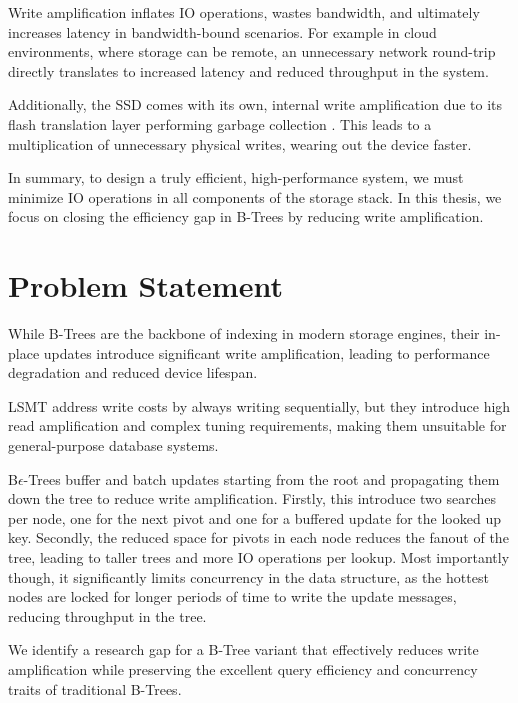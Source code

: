 Write amplification inflates \ac{IO} operations, wastes bandwidth, and ultimately increases latency in bandwidth-bound scenarios.
For example in cloud environments, where storage can be remote, an unnecessary network round-trip directly translates to increased latency and reduced throughput in the system.

Additionally, the \ac{SSD} comes with its own, internal write amplification due to its flash translation layer performing garbage collection \cite{haas2023modern}. 
This leads to a multiplication of unnecessary physical writes, wearing out the device faster.

In summary, to design a truly efficient, high-performance system, we must minimize \ac{IO} operations in all components of the storage stack. 
In this thesis, we focus on closing the efficiency gap in B-Trees by reducing write amplification.

\section{Problem Statement}
While B-Trees are the backbone of indexing in modern storage engines, their in-place updates introduce significant write amplification, leading to performance degradation and reduced device lifespan. 

\ac{LSMT} address write costs by always writing sequentially, but they introduce high read amplification and complex tuning requirements, making them unsuitable for general-purpose database systems.

B$\epsilon$-Trees buffer and batch updates starting from the root and propagating them down the tree to reduce write amplification. 
Firstly, this introduce two searches per node, one for the next pivot and one for a buffered update for the looked up key.
Secondly, the reduced space for pivots in each node reduces the fanout of the tree, leading to taller trees and more \ac{IO} operations per lookup.
Most importantly though, it significantly limits concurrency in the data structure, as the hottest nodes are locked for longer periods of time to write the update messages, reducing throughput in the tree.

We identify a research gap for a B-Tree variant that effectively reduces write amplification while preserving the excellent query efficiency and concurrency traits of traditional B-Trees.


